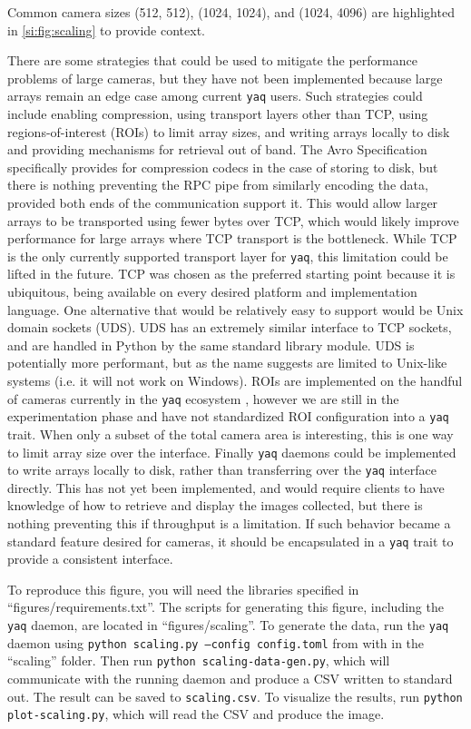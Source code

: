 \documentclass[11pt, full]{article}
\newcommand\yaq{\texttt{yaq}}
\begin{document}
Common camera sizes (512, 512), (1024, 1024), and (1024, 4096) are highlighted in \ref{si:fig:scaling} to provide context.

There are some strategies that could be used to mitigate the performance problems of large cameras, but they have not been implemented because large arrays remain an edge case among current \yaq{} users.
Such strategies could include enabling compression, using transport layers other than TCP, using regions-of-interest (ROIs) to limit array sizes, and writing arrays locally to disk and providing mechanisms for retrieval out of band.
The Avro Specification \cite{AvroSpecification} specifically provides for compression codecs in the case of storing to disk, but there is nothing preventing the RPC pipe from similarly encoding the data, provided both ends of the communication support it.
This would allow larger arrays to be transported using fewer bytes over TCP, which would likely improve performance for large arrays where TCP transport is the bottleneck.
While TCP is the only currently supported transport layer for \yaq{}, this limitation could be lifted in the future.
TCP was chosen as the preferred starting point because it is ubiquitous, being available on every desired platform and implementation language.
One alternative that would be relatively easy to support would be Unix domain sockets (UDS).
UDS has an extremely similar interface to TCP sockets, and are handled in Python by the same standard library module.
UDS is potentially more performant, but as the name suggests are limited to Unix-like systems (i.e. it will not work on Windows).
ROIs are implemented on the handful of cameras currently in the \yaq{} ecosystem \cite{yaqd_andor,yaqd_pi}, however we are still in the experimentation phase and have not standardized ROI configuration into a \yaq{} trait.
When only a subset of the total camera area is interesting, this is one way to limit array size over the interface.
Finally \yaq{} daemons could be implemented to write arrays locally to disk, rather than transferring over the \yaq{} interface directly.
This has not yet been implemented, and would require clients to have knowledge of how to retrieve and display the images collected, but there is nothing preventing this if throughput is a limitation.
If such behavior became a standard feature desired for cameras, it should be encapsulated in a \yaq{} trait to provide a consistent interface.

To reproduce this figure, you will need the libraries specified in ``figures/requirements.txt''.
The scripts for generating this figure, including the \yaq{} daemon, are located in ``figures/scaling''.
To generate the data, run the \yaq{} daemon using \texttt{python scaling.py --config config.toml} from with in the ``scaling'' folder.
Then run \texttt{python scaling-data-gen.py}, which will communicate with the running daemon and produce a CSV written to standard out.
The result can be saved to \texttt{scaling.csv}.
To visualize the results, run \texttt{python plot-scaling.py}, which will read the CSV and produce the image.
\end{document}
